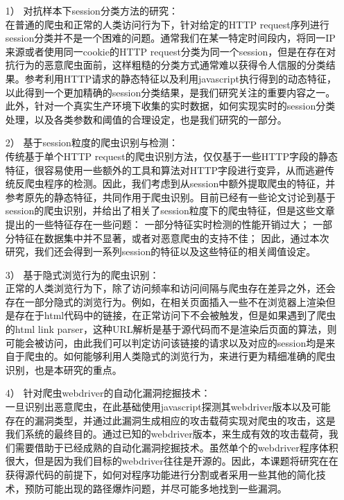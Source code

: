 \documentclass[doctor,privacy,twoside]{buaa_mac}
\begin{document}
\begin{itemize}
\item[1）] 对抗样本下session分类方法的研究：\\
在普通的爬虫和正常的人类访问行为下，针对给定的HTTP request序列进行session分类并不是一个困难的问题。通常我们在某一特定时间段内，将同一IP来源或者使用同一cookie的HTTP request分类为同一个session，但是在存在对抗行为的恶意爬虫面前，这样粗糙的分类方式通常难以获得令人信服的分类结果。参考利用HTTP请求的静态特征以及利用javascript执行得到的动态特征，以此得到一个更加精确的session分类结果，是我们研究关注的重要内容之一。此外，针对一个真实生产环境下收集的实时数据，如何实现实时的session分类处理，以及各类参数和阈值的合理设定，也是我们研究的一部分。

\item[2）] 基于session粒度的爬虫识别与检测：\\
传统基于单个HTTP request的爬虫识别方法，仅仅基于一些HTTP字段的静态特征，很容易使用一些额外的工具和算法对HTTP字段进行变异，从而逃避传统反爬虫程序的检测。因此，我们考虑到从session中额外提取爬虫的特征，并参考原先的静态特征，共同作用于爬虫识别。目前已经有一些论文讨论到基于session的爬虫识别，并给出了相关了session粒度下的爬虫特征，但是这些文章提出的一些特征存在一些问题：
一部分特征实时检测的性能开销过大；
一部分特征在数据集中并不显著，或者对恶意爬虫的支持不佳；
因此，通过本次研究，我们还会得到一系列session的特征以及这些特征的相关阈值设定。

\item[3）] 基于隐式浏览行为的爬虫识别： \\
正常的人类浏览行为下，除了访问频率和访问间隔与爬虫存在差异之外，还会存在一部分隐式的浏览行为。例如，在相关页面插入一些不在浏览器上渲染但是存在于html代码中的链接，在正常访问下不会被触发，但是如果遇到了爬虫的html link parser，这种URL解析是基于源代码而不是渲染后页面的算法，则可能会被访问，由此我们可以判定访问该链接的请求以及对应的session均是来自于爬虫的。如何能够利用人类隐式的浏览行为，来进行更为精细准确的爬虫识别，也是本研究的重点。

\item[4）] 针对爬虫webdriver的自动化漏洞挖掘技术： \\
一旦识别出恶意爬虫，在此基础使用javascript探测其webdriver版本以及可能存在的漏洞类型，并通过此漏洞生成相应的攻击载荷实现对爬虫的攻击，这是我们系统的最终目的。通过已知的webdriver版本，来生成有效的攻击载荷，我们需要借助于已经成熟的自动化漏洞挖掘技术。虽然单个的webdriver程序体积很大，但是因为我们目标的webdriver往往是开源的。因此，本课题将研究在在获得源代码的前提下，如何对程序功能进行分割或者采用一些其他的简化技术，预防可能出现的路径爆炸问题，并尽可能多地找到一些漏洞。
\end{itemize}
\end{document}
